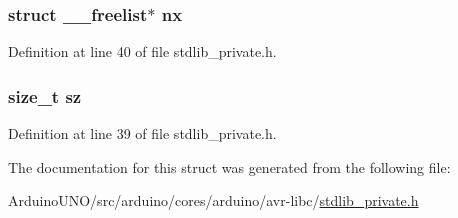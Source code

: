 \subsubsection[{nx}]{\setlength{\rightskip}{0pt plus 5cm}struct {\bf \+\_\+\+\_\+freelist}$\ast$ nx}\label{struct____freelist_ae718f53598ce7902b5c21759e2d0a2ec}


Definition at line 40 of file stdlib\+\_\+private.\+h.

\hypertarget{struct____freelist_aad50db3bff52eed270f16ef9e6acd8b1}{}
\subsubsection[{sz}]{\setlength{\rightskip}{0pt plus 5cm}size\+\_\+t sz}\label{struct____freelist_aad50db3bff52eed270f16ef9e6acd8b1}


Definition at line 39 of file stdlib\+\_\+private.\+h.



The documentation for this struct was generated from the following file\+:\begin{DoxyCompactItemize}
\item 
Arduino\+U\+N\+O/src/arduino/cores/arduino/avr-\/libc/\hyperlink{stdlib__private_8h}{stdlib\+\_\+private.\+h}\end{DoxyCompactItemize}
